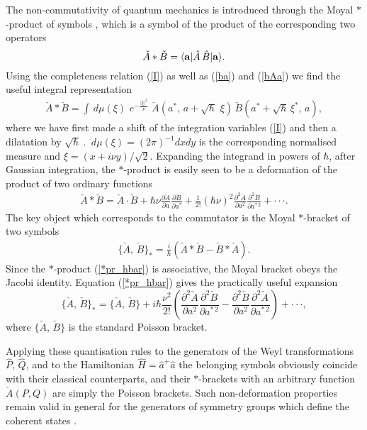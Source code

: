 \documentclass[a4paper,12pt]{article}
\begin{document}
\noindent
The non-commutativity of quantum mechanics is introduced through
the Moyal $*$-product of symbols
\cite{Moyal}, which is a symbol of the product of the
corresponding two operators
\begin{equation}\label{Moyalproduct}
\check A * \check B= \langle{\bf a}|\hat
A\,\hat B|{\bf a}\rangle.
\end{equation}
Using the completeness relation (\ref{I})
as well as (\ref{ba}) and  (\ref{bAa})
we find the useful integral representation
\begin{eqnarray}\label{*pr}
\check A * \check B =
\int\,d\mu(\xi) \,\,e^{-\frac{|\xi|^2}{\nu}}\,\, \check A(a^*,\,a+\sqrt{\hbar}\,\,\xi)
\, \check B(a^*+\sqrt{\hbar}\,\xi^*,\, a),
\end{eqnarray}
where we have  first made a shift of the integration
variables (\ref{I}) and then a dilatation
by $\sqrt\hbar~$. $~d\mu(\xi)=(2\pi)^{-1} dx dy $
is the corresponding normalised measure and $\xi=(x+i\nu
y)/{\sqrt{2}}$. Expanding the integrand in powers of $\hbar$, after
Gaussian integration, the $*$-product is easily seen to be a
deformation of the product of two ordinary functions
\begin{eqnarray}\label{*pr_hbar}
\check A* \check B= \check A\cdot \check B+
\hbar\nu \frac{\partial \check A}{\partial a}\frac{\partial \check B}
{\partial a^*}+
\frac{1}{2!}(\hbar\nu)^2 \frac{\partial^2 \check A}
{\partial a^2}\frac{\partial^2 \check B}{\partial a^{*\,2}}+\cdot\cdot\cdot .
\end{eqnarray}
The key object which corresponds to the commutator is the Moyal
$*$-bracket of two symbols
\begin{eqnarray}\label{*br}
\{\check A,\,\check B\}_*=\frac{i}{\hbar}(\check A*\check B-
\check B*\check A).
\end{eqnarray}
Since the $*$-product (\ref{*pr_hbar}) is associative, the Moyal
bracket obeys the Jacobi identity.
Equation (\ref{*pr_hbar}) gives the practically useful expansion
\begin{equation}\label{*brh}
\{\check A,\,\check B\}_*= \{\check A,\,\check B\} +
i\hbar\frac{\nu^2}{2!}\left(  \frac{\partial^2 \check A}{\partial a^2}
\frac{\partial^2 \check B}{\partial a^{*\,2}}-
\frac{\partial^2 \check B}{\partial a^2}
\frac{\partial^2 \check A}{\partial a^{*\,2}}
\right)+\cdot\cdot\cdot,
\end{equation}
where $\{\check A,\,\check B\}$ is the standard Poisson bracket.

\noindent
Applying these quantisation rules to the generators
of the Weyl transformations $\hat P$, $\hat Q$, and to the Hamiltonian $\hat
H=\hat a^+ \hat a$ the belonging symbols obviously coincide with their
classical counterparts, and their $*$-brackets with an
arbitrary function $\check A(P,Q)$ are simply the Poisson brackets. Such
non-deformation properties remain valid in general
for the generators of symmetry groups which define the coherent states
\cite{Perelomov}.
\end{document}
